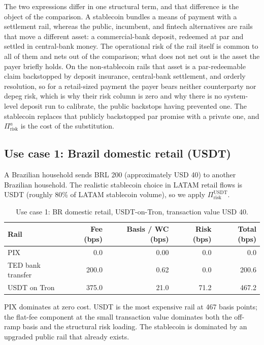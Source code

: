 The two expressions differ in one structural term, and that difference is the object of the comparison. A stablecoin bundles a means of payment with a settlement rail, whereas the public, incumbent, and fintech alternatives are rails that move a different asset: a commercial-bank deposit, redeemed at par and settled in central-bank money. The operational risk of the rail itself is common to all of them and nets out of the comparison; what does not net out is the asset the payer briefly holds. On the non-stablecoin rails that asset is a par-redeemable claim backstopped by deposit insurance, central-bank settlement, and orderly resolution, so for a retail-sized payment the payer bears neither counterparty nor depeg risk, which is why their risk column is zero and why there is no system-level deposit run to calibrate, the public backstops having prevented one. The stablecoin replaces that publicly backstopped par promise with a private one, and $\Pi_{\text{risk}}^{a}$ is the cost of the substitution.

\subsection{Use case 1: Brazil domestic retail (USDT)}\label{sub:bra_domestic}

A Brazilian household sends BRL 200 (approximately USD 40) to another Brazilian household. The realistic stablecoin choice in LATAM retail flows is USDT (roughly 80\% of LATAM stablecoin volume), so we apply $\Pi_{\text{risk}}^{\text{USDT}}$.

\begin{table}[H]
\centering
\caption{Use case 1: BR domestic retail, USDT-on-Tron, transaction value USD 40.}\label{tab:uc1}
\begin{tabular}{lrrrr}
\toprule
Rail & Fee (bps) & Basis / WC (bps) & Risk (bps) & Total (bps) \\
\midrule
PIX                  & 0.0    & 0.00  & 0.0  & 0.0   \\
TED bank transfer    & 200.0  & 0.62  & 0.0  & 200.6 \\
USDT on Tron         & 375.0  & 21.0  & 71.2 & 467.2 \\
\bottomrule
\end{tabular}
\end{table}

PIX dominates at zero cost. USDT is the most expensive rail at 467 basis points; the flat-fee component at the small transaction value dominates both the off-ramp basis and the structural risk loading. The stablecoin is dominated by an upgraded public rail that already exists.

